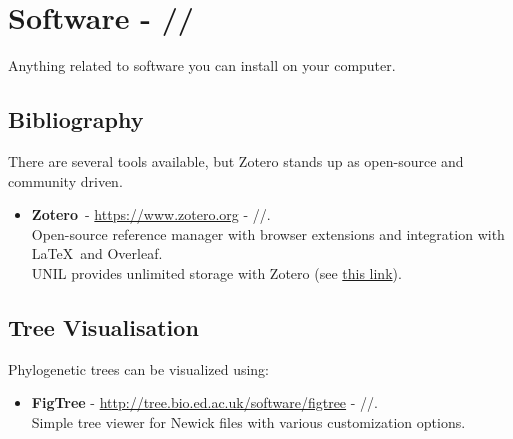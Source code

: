 \section{Software - \faLinux/\faApple/\faWindows}
Anything related to software you can install on your computer.
\subsection{Bibliography}
There are several tools available, but Zotero stands up as open-source and community driven.
\begin{itemize}
    \item \textbf{Zotero}\ - \url{https://www.zotero.org} - \faLinux/\faApple/\faWindows.\\
    Open-source reference manager with browser extensions and integration with \LaTeX \ and Overleaf.\\
    UNIL provides unlimited storage with Zotero (see \href{https://wp.unil.ch/newsci/stockage-illimite-desormais-gratuit-sur-zotero-pour-toute-la-communaute-unil/}{this link}).
\end{itemize}

\subsection{Tree Visualisation}
Phylogenetic trees can be visualized using:
\begin{itemize}
    \item \textbf{FigTree} - \url{http://tree.bio.ed.ac.uk/software/figtree} - \faLinux/\faApple/\faWindows.\\
    Simple tree viewer for Newick files with various customization options.
\end{itemize}